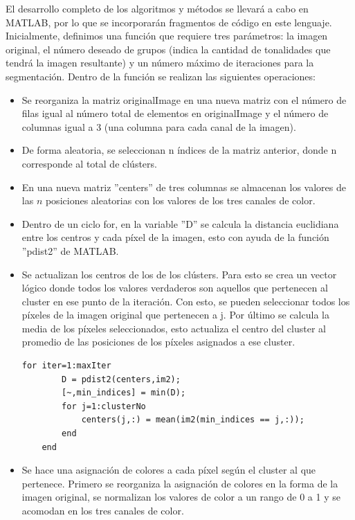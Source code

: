 El desarrollo completo de los algoritmos y métodos se llevará a cabo en MATLAB, por lo que se incorporarán fragmentos de código en este lenguaje. Inicialmente, definimos una función que requiere tres parámetros: la imagen original, el número deseado de grupos (indica la cantidad de tonalidades que tendrá la imagen resultante) y un número máximo de iteraciones para la segmentación. Dentro de la función se realizan las siguientes operaciones:

\begin{itemize}
    \item Se reorganiza la matriz originalImage en una nueva matriz con el número de filas igual al número total de elementos en originalImage y el número de columnas igual a 3 (una columna para cada canal de la imagen).
    \item De forma aleatoria, se seleccionan n índices de la matriz anterior, donde n corresponde al total de clústers. 
    \item En una nueva matriz ''centers'' de tres columnas se almacenan los valores de las $n$ posiciones aleatorias con los valores de los tres canales de color.
    \item Dentro de un ciclo for, en la variable ''D'' se calcula la distancia euclidiana entre los centros y cada píxel de la imagen, esto con ayuda de la función ''pdist2'' de MATLAB.
    \item Se actualizan los centros de los de los clústers. Para esto se crea un vector lógico donde todos los valores verdaderos son aquellos que pertenecen al cluster en ese punto de la iteración. Con esto, se pueden seleccionar todos los píxeles  de la imagen original que pertenecen a j. Por último se calcula la media de los píxeles seleccionados, esto actualiza el centro del cluster al promedio de las posiciones de los píxeles asignados a ese cluster.

    \begin{lstlisting}[style=Matlab-editor, caption=Fragmento del algoritmo K Means, basicstyle=\fontsize{8}{12}\selectfont]
    for iter=1:maxIter
        D = pdist2(centers,im2);
        [~,min_indices] = min(D);
        for j=1:clusterNo
            centers(j,:) = mean(im2(min_indices == j,:));
        end
    end
    \end{lstlisting}

    \item Se hace una asignación de colores a cada píxel según el cluster al que pertenece. Primero se  reorganiza la asignación de colores en la forma de la imagen original, se normalizan los valores de color a un rango de 0 a 1 y se acomodan en los tres canales de color.
\end{itemize}

